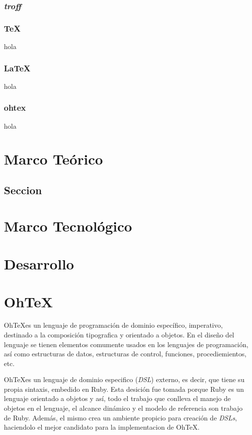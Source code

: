 \documentclass[12pt,letterpaper,titlepage,oneside,openright]{book}
\newcommand{\ohtex}{OhTeX}
\begin{document}
\subsection{\textit{troff}}


\subsection{\TeX}
hola
\subsection{\LaTeX}
hola
\subsection{ohtex}
hola

\chapter{Marco Teórico}
\lipsum[1-2]
\section{Seccion}
\lipsum[1-2]
\chapter{Marco Tecnológico}
\lipsum[1-2]
\chapter{Desarrollo}
\lipsum[1-2]
\chapter{OhTeX}

\ohtex es un lenguaje de programación de dominio específico, imperativo,
destinado a la composición tipografica y orientado a objetos. En el diseño del
lenguaje se tienen elementos comumente usados en los lenguajes de programación,
así como estructuras de datos, estructuras de control, funciones,
procediemientos, etc.

\ohtex es un lenguaje de dominio especifico (\textit{DSL}) externo, es decir,
que tiene su propia sintaxis, embedido en Ruby. Esta desición fue tomada porque
Ruby es un lenguaje orientado a objetos y así, todo el trabajo que conlleva el
manejo de objetos en el lenguaje, el alcance dinámico y el modelo de referencia
son trabajo de Ruby. Además, el mismo crea un ambiente propicio para creación de
\textit{DSLs}, haciendolo el mejor candidato para la implementacion de \ohtex.
\end{document}

